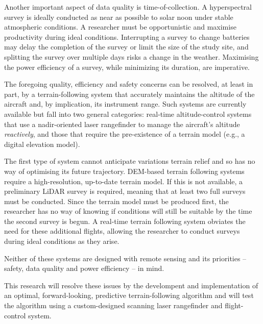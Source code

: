 Another important aspect of data quality is time-of-collection. A hyperspectral survey is ideally conducted as near as possible to solar noon under stable atmospheric conditions. A researcher must be opportunistic and maximise productivity during ideal conditions. Interrupting a survey to change batteries may delay the completion of the survey or limit the size of the study site, and splitting the survey over multiple days risks a change in the weather. Maximising the power efficiency of a survey, while minimizing its duration, are imperative.




The foregoing quality, efficiency and safety concerns can be resolved, at least in part, by a terrain-following system that accurately maintains the altitude of the aircraft and, by implication, its instrument range. Such systems are currently available but fall into two general categories: real-time altitude-control systems that use a nadir-oriented laser rangefinder to manage the aircraft's altitude \emph{reactively}, and those that require the pre-existence of a terrain model (e.g., a digital elevation model).

The first type of system cannot anticipate variations terrain relief and so has no way of optimising its future trajectory. DEM-based terrain following systems require a high-resolution, up-to-date terrain model. If this is not available, a preliminary LiDAR survey is required, meaning that at least two full surveys must be conducted. Since the terrain model must be produced first, the researcher has no way of knowing if conditions will still be suitable by the time the second survey is begun. A real-time terrain following system obviates the need for these additional flights, allowing the researcher to conduct surveys during ideal conditions as they arise. 

Neither of these systems are designed with remote sensing and its priorities -- safety, data quality and power efficiency -- in mind. 

This research will resolve these issues by the develompent and implementation of an optimal, forward-looking, predictive terrain-following algorithm and will test the algorithm using a custom-designed scanning laser rangefinder and flight-control system.
